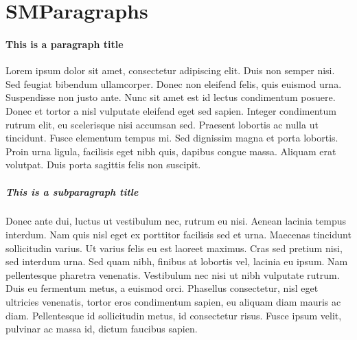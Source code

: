 \documentclass[class=scrartcl,crop=false]{standalone}
\begin{document}
\section{SMParagraphs}

\paragraph{This is a paragraph title}

Lorem ipsum dolor sit amet, consectetur adipiscing elit. Duis non semper nisi. Sed feugiat bibendum ullamcorper. Donec non eleifend felis, quis euismod urna. Suspendisse non justo ante. Nunc sit amet est id lectus condimentum posuere. Donec et tortor a nisl vulputate eleifend eget sed sapien. Integer condimentum rutrum elit, eu scelerisque nisi accumsan sed. Praesent lobortis ac nulla ut tincidunt. Fusce elementum tempus mi. Sed dignissim magna et porta lobortis. Proin urna ligula, facilisis eget nibh quis, dapibus congue massa. Aliquam erat volutpat. Duis porta sagittis felis non suscipit.

\subparagraph{This is a subparagraph title}

Donec ante dui, luctus ut vestibulum nec, rutrum eu nisi. Aenean lacinia tempus interdum. Nam quis nisl eget ex porttitor facilisis sed et urna. Maecenas tincidunt sollicitudin varius. Ut varius felis eu est laoreet maximus. Cras sed pretium nisi, sed interdum urna. Sed quam nibh, finibus at lobortis vel, lacinia eu ipsum. Nam pellentesque pharetra venenatis. Vestibulum nec nisi ut nibh vulputate rutrum. Duis eu fermentum metus, a euismod orci. Phasellus consectetur, nisl eget ultricies venenatis, tortor eros condimentum sapien, eu aliquam diam mauris ac diam. Pellentesque id sollicitudin metus, id consectetur risus. Fusce ipsum velit, pulvinar ac massa id, dictum faucibus sapien.
\end{document}

